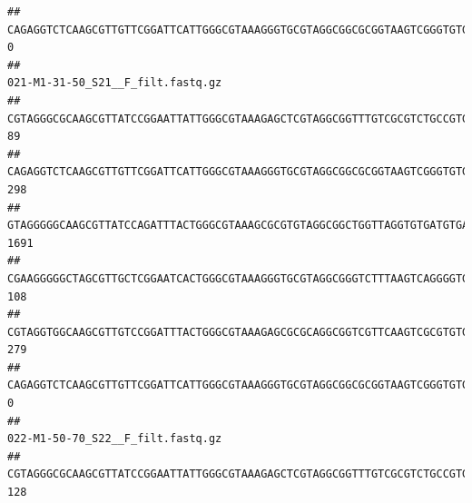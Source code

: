 \documentclass[]{article}
\begin{document}
\begin{verbatim}
## CAGAGGTCTCAAGCGTTGTTCGGATTCATTGGGCGTAAAGGGTGCGTAGGCGGCGCGGTAAGTCGGGTGTGAAATCTCGGGGCTTAACTCCGAAACTGCATTCGATACTGCCGTGCTTGAGGACTGGAGAGGAGACTGGAATTTACGGTGTAGCGGTGAAATGCGTAGATATCGTAAGGAAGACCAGTGGCGAAGGCGGGTCTCTGGACAGTTCCTGACGCTGAGGCACGAAGGCCAGGGGAGCAAACG                                0
##                                                                                                                                                                                                                                                           021-M1-31-50_S21__F_filt.fastq.gz
## CGTAGGGCGCAAGCGTTATCCGGAATTATTGGGCGTAAAGAGCTCGTAGGCGGTTTGTCGCGTCTGCCGTGAAAGTCCGGGGCTCAACTCCGGATCTGCGGTGGGTACGGGCAGACTAGAGTGATGTAGGGGAGACTGGAATTCCTGGTGTAGCGGTGAAATGCGCAGATATCAGGAGGAACACCGATGGCGAAGGCAGGTCTCTGGGCATTAACTGACGCTGAGGAGCGAAAGCATGGGGAGCGAACA                                89
## CAGAGGTCTCAAGCGTTGTTCGGATTCATTGGGCGTAAAGGGTGCGTAGGCGGCGCGGTAAGTCGGGTGTGAAATCTCGGAGCTTAACTCCGAAACTGCATTCGATACTGCCGTGCTTGAGGACTGGAGAGGAGACTGGAATTTACGGTGTAGCGGTGAAATGCGTAGATATCGTAAGGAAGACCAGTGGCGAAGGCGGGTCTCTGGACAGTTCCTGACGCTGAGGCACGAAGGCCAGGGGAGCAAACG                               298
## GTAGGGGGCAAGCGTTATCCAGATTTACTGGGCGTAAAGCGCGTGTAGGCGGCTGGTTAGGTGTGATGTGAAATCTTCCGGCTCAACCGGAAAACTGCATTGCAAACCGGCCTGGCTAGAGTGCAGGAGAGGGAAGCGGAATTCCAGGTGTAGCGGTGAAATGCGTAGATATCTGGAGGAACACCAGTGGCGAAGGCGGCTTCCTGGCCTGCAACTGACGCTGAGACGCGAAAGCGTGGGGAGCGAAC                               1691
## CGAAGGGGGCTAGCGTTGCTCGGAATCACTGGGCGTAAAGGGTGCGTAGGCGGGTCTTTAAGTCAGGGGTGAAATCCTGGAGCTCAACTCCAGAACTGCCTTTGATACTGAAGATCTTGAGTTCGGGAGAGGTGAGTGGAACTGCGAGTGTAGAGGTGAAATTCGTAGATATTCGCAAGAACACCAGTGGCGAAGGCGGCTCACTGGCCCGATACTGACGCTGAGGCACGAAAGCGTGGGGAGCAAACA                               108
## CGTAGGTGGCAAGCGTTGTCCGGATTTACTGGGCGTAAAGAGCGCGCAGGCGGTCGTTCAAGTCGCGTGTGAAAGCCCCCGGCTCAACTGGGGAGGGTCACGCGATACTGATCGACTCGAAGGCAGGAGAGGGTAGTGGAATTCCCGGTGTAGTGGTGAAATGCGTAGATATCGGGAGGAACACCAGTGGCGAAGGCGACTACCTGGCCTGTTCTTGACGCTGAGGCGCGAAAGCTAGGGGAGCAAACG                               279
## CAGAGGTCTCAAGCGTTGTTCGGATTCATTGGGCGTAAAGGGTGCGTAGGCGGCGCGGTAAGTCGGGTGTGAAATCTCGGGGCTTAACTCCGAAACTGCATTCGATACTGCCGTGCTTGAGGACTGGAGAGGAGACTGGAATTTACGGTGTAGCGGTGAAATGCGTAGATATCGTAAGGAAGACCAGTGGCGAAGGCGGGTCTCTGGACAGTTCCTGACGCTGAGGCACGAAGGCCAGGGGAGCAAACG                                 0
##                                                                                                                                                                                                                                                           022-M1-50-70_S22__F_filt.fastq.gz
## CGTAGGGCGCAAGCGTTATCCGGAATTATTGGGCGTAAAGAGCTCGTAGGCGGTTTGTCGCGTCTGCCGTGAAAGTCCGGGGCTCAACTCCGGATCTGCGGTGGGTACGGGCAGACTAGAGTGATGTAGGGGAGACTGGAATTCCTGGTGTAGCGGTGAAATGCGCAGATATCAGGAGGAACACCGATGGCGAAGGCAGGTCTCTGGGCATTAACTGACGCTGAGGAGCGAAAGCATGGGGAGCGAACA                               128

\end{verbatim}
\end{document}
